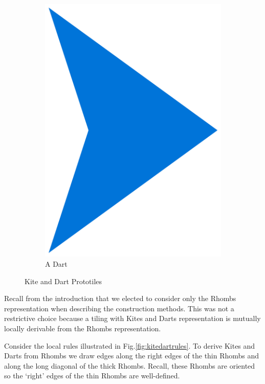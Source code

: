 \documentclass[
  oneside,
  11pt, a4paper,
  footinclude=true,
  headinclude=true,
  cleardoublepage=empty
]{scrbook}
\begin{document}
\begin{figure}
\begin{subfigure}[t]{0.3\textwidth}
\includegraphics[width=\textwidth]{dart}
\caption{A Dart}
\end{subfigure}
\caption{Kite and Dart Prototiles}
\label{fig:kitedart}
\end{figure}

Recall from the introduction that we elected to consider only the Rhombs representation when describing the construction methods. This was not a restrictive choice because a tiling with Kites and Darts representation is mutually locally derivable from the Rhombs representation.

Consider the local rules illustrated in Fig.\ref{fig:kitedartrules}. To derive Kites and Darts from Rhombs we draw edges along the right edges of the thin Rhombs and along the long diagonal of the thick Rhombs. Recall, these Rhombs are oriented so the `right' edges of the thin Rhombs are well-defined. 
\end{document}
